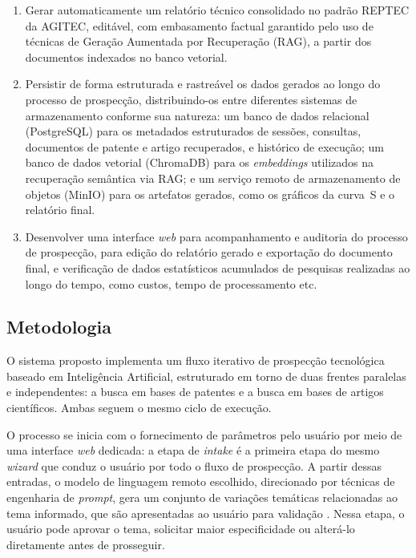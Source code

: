 \documentclass[12pt, a4paper]{article}
\begin{document}
\begin{enumerate}[label=\roman*.]
    \item Gerar automaticamente um relatório técnico consolidado no padrão
    REPTEC da AGITEC, editável, com embasamento factual garantido pelo uso de técnicas de
    Geração Aumentada por Recuperação (RAG), a partir dos
    documentos indexados no banco vetorial.

    \item Persistir de forma estruturada e rastreável os dados gerados ao longo
    do processo de prospecção, distribuindo-os entre diferentes sistemas de
    armazenamento conforme sua natureza: um banco de dados relacional
    (PostgreSQL) para os metadados estruturados de sessões, consultas,
    documentos de patente e artigo recuperados, e histórico de execução; um
    banco de dados vetorial (ChromaDB) para os \textit{embeddings} utilizados
    na recuperação semântica via RAG; e um serviço remoto de armazenamento de
    objetos (MinIO) para os artefatos gerados, como os gráficos da curva~S e o
    relatório final.

    \item Desenvolver uma interface \textit{web} para acompanhamento e auditoria do processo
    de prospecção, para edição do relatório gerado e exportação do documento final, e verificação de dados estatísticos acumulados de pesquisas realizadas ao longo do tempo, como custos, tempo de processamento etc.
  \end{enumerate}

  \subsection{Metodologia}

  O sistema proposto implementa um fluxo iterativo de prospecção tecnológica
baseado em Inteligência Artificial, estruturado em torno de duas frentes paralelas e
independentes: a busca em bases de patentes e a busca em bases de artigos
científicos. Ambas seguem o mesmo ciclo de execução.

  O processo se inicia com o fornecimento de parâmetros pelo usuário por meio
de uma interface \textit{web} dedicada: a etapa de \textit{intake} é a primeira etapa do mesmo \textit{wizard} que conduz
o usuário por todo o fluxo de prospecção. A partir dessas entradas, o modelo de linguagem remoto escolhido, direcionado por técnicas de engenharia de \textit{prompt}, gera um conjunto
de variações temáticas relacionadas ao tema informado, que são apresentadas ao usuário
para validação \cite{white2023}. Nessa etapa, o usuário pode aprovar o tema,
solicitar maior especificidade ou alterá-lo diretamente antes de prosseguir.
\end{document}
